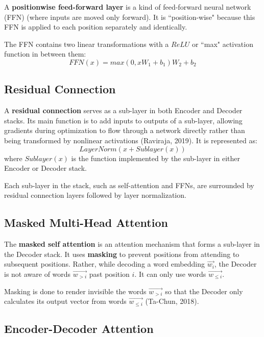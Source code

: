 A \textbf{positionwise feed-forward layer} is a kind of feed-forward neural network (FFN) (where inputs are moved only forward). It is ``position-wise" because this FFN is applied to each position separately and identically. 

The FFN contains two linear transformations with a $ReLU$ or ``max" activation function in between them:
$$
FFN(x) = max(0, x W_1 + b_1) W_2 + b_2
$$

\subsection{Residual Connection} \label{sec:ResidualConnections}

A \textbf{residual connection} serves as a sub-layer in both Encoder and Decoder stacks. Its main function is to add inputs to outputs of a sub-layer, allowing gradients during optimization to flow through a network directly rather than being transformed by nonlinear activations (Raviraja, 2019). It is represented as: 
$$
LayerNorm(x + Sublayer(x))
$$
where $Sublayer(x)$ is the function implemented by the sub-layer in either Encoder or Decoder stack.

Each sub-layer in the stack, such as self-attention and FFNs, are surrounded by residual connection layers followed by layer normalization. 




\subsection{Masked Multi-Head Attention} \label{sec:MaskedMultiHeadAttention}

The \textbf{masked self attention} is an attention mechanism that forms a sub-layer in the Decoder stack. It uses \textbf{masking} to prevent positions from attending to subsequent positions. Rather, while decoding a word embedding $\overrightarrow{w_i}$, the Decoder is not aware of words  $\overrightarrow{w_{>i}}$ past position $i$. It can only use words $\overrightarrow{w_{\leq i}}$.

Masking is done to render invisible the words $\overrightarrow{w_{>i}}$ so that the Decoder only calculates its output vector from words $\overrightarrow{w_{\leq i}}$ (Ta-Chun, 2018). 

\subsection{Encoder-Decoder Attention} \label{sec:EncoderDecoderAttention}

